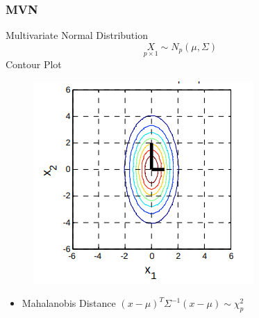 \documentclass[aspectratio=169,10pt,t]{beamer}
\begin{document}
\begin{frame}[t]
    \frametitle{MVN}

    Multivariate Normal Distribution
    \[
        \underset{p\times1}{X} \sim N_p(\mu, \Sigma)
    \] 
    Contour Plot 
    \begin{figure}[H]
        \centering
        \includegraphics[scale=0.3]{images/1.png}
    \end{figure}

    \begin{itemize}
        \item Mahalanobis Distance $(x - \mu)^T \Sigma^{-1} (x - \mu)\sim \chi^2_p$
    \end{itemize}

\end{frame}
\end{document}
